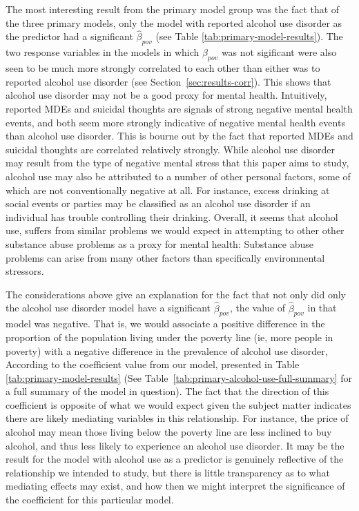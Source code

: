 \documentclass{article}
\begin{document}
The most interesting result from the primary model group
was the fact that of the three primary models,
only the model with reported alcohol use disorder
as the predictor had a significant $\hat{\beta}_{pov}$
(see Table \ref{tab:primary-model-results}).
The two response variables in the models in which
$\hat{\beta}_{pov}$ was not sigificant were also
seen to be much more strongly correlated to each other
than either was to reported alcohol use disorder
(see Section~\ref{sec:results-corr}).
This shows that alcohol use disorder may not
be a good proxy for mental health.
Intuitively, reported MDEs and suicidal thoughts
are signals of strong negative mental health events,
and both seem more strongly indicative of negative mental health events
than alcohol use disorder.
This is bourne out by the fact that reported MDEs and suicidal thoughts
are correlated relatively strongly.
While alcohol use disorder may result from the type of negative
mental stress that this paper aims to study,
alcohol use may also be attributed to a number
of other personal factors, some of which are not conventionally
negative at all.
For instance, excess drinking at social events or parties
may be classified as an alcohol use disorder if
an individual has trouble controlling their drinking.
Overall, it seems that alcohol use,
suffers from similar problems we would expect in attempting
to other other substance abuse problems
as a proxy for mental health:
Substance abuse problems can arise from many other
factors than specifically environmental stressors.

The considerations above give an explanation for the fact that
not only did only the alcohol use disorder model have a
significant $\hat{\beta}_{pov}$, the value of $\hat{\beta}_{pov}$
in that model was negative.
That is, we would associate a positive difference in
the proportion of the population living under the poverty line
(ie, more people in poverty)
with a negative difference in the prevalence of alcohol use disorder,
According to the coefficient value from our model, presented in
Table \ref{tab:primary-model-results}
(See Table~\ref{tab:primary-alcohol-use-full-summary} for a full
summary of the model in question).
The fact that the direction of this coefficient is opposite of
what we would expect given the subject matter
indicates there are likely mediating variables in this relationship.
For instance, the price of alcohol may mean those living below
the poverty line are less inclined to buy alcohol,
and thus less likely to experience an alcohol use disorder.
It may be the result for the model with alcohol use as
a predictor is genuinely reflective of the relationship
we intended to study, but there is little transparency
as to what mediating effects may exist,
and how then we might interpret the significance of
the coefficient for this particular model.
\end{document}

